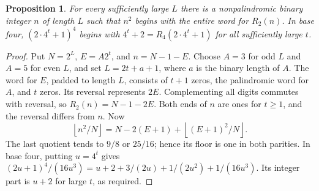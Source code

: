 \documentclass[11pt,reqno,a4paper]{amsart}
\newtheorem{proposition}[theorem]{Proposition}
\theoremstyle{remark}
\begin{document}
\begin{proposition}\label{prop:reversal}
For every sufficiently large \(L\) there is a nonpalindromic binary
integer \(n\) of length \(L\) such that \(n^2\) begins with the entire
word for \(R_2(n)\). In base four, \((2\cdot4^t+1)^4\) begins with
\(4^t+2=R_4(2\cdot4^t+1)\) for all sufficiently large \(t\).
\end{proposition}
\begin{proof}
Put \(N=2^L\), \(E=A2^t\), and \(n=N-1-E\).
Choose \(A=3\) for odd \(L\) and \(A=5\) for even \(L\), and set
\(L=2t+a+1\), where \(a\) is the binary length of \(A\).
The word for \(E\), padded to length \(L\), consists of \(t+1\) zeros,
the palindromic word for \(A\), and \(t\) zeros. Its reversal represents
\(2E\). Complementing all digits commutes with reversal, so
\(R_2(n)=N-1-2E\). Both ends of \(n\) are ones for \(t\ge1\), and the
reversal differs from \(n\). Now
\[
 \left\lfloor n^2/N\right\rfloor
 =N-2(E+1)+\left\lfloor(E+1)^2/N\right\rfloor.
\]
The last quotient tends to \(9/8\) or \(25/16\); hence its floor is
one in both parities. In base four, putting \(u=4^t\) gives
\((2u+1)^4/(16u^3)=u+2+3/(2u)+1/(2u^2)+1/(16u^3)\).
Its integer part is \(u+2\) for large \(t\), as required.
\end{proof}
\end{document}
